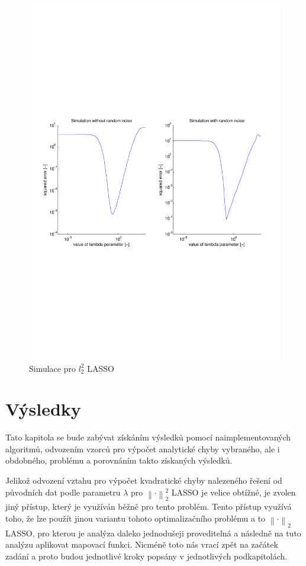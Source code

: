 \documentclass[FM,BP]{tulthesis}
\begin{document}
\begin{figure}[!ht]
	\begin{center}
		\includegraphics[scale=0.7]{obr/l22simulation.pdf}
	\end{center}
	\caption{Simulace pro $l_{2}^{2}$ LASSO}
	\label{fig:l22sim}
\end{figure}
\chapter{Výsledky}
\label{ch:vysledky}
Tato kapitola se bude zabývat získáním výsledků pomocí naimplementovaných algoritmů, odvozením vzorců pro výpočet analytické chyby vybraného, ale i obdobného, problému a porovnáním takto získaných výsledků. 

Jelikož odvození vztahu pro výpočet kvadratické chyby nalezeného řešení od původních dat podle parametru $\lambda$ pro $\left\| \cdot \right\|_{2}^{2} $ LASSO je velice obtížné, je zvolen jiný přístup, který je využíván běžně pro tento problém. Tento přístup využívá toho, že lze použít jinou variantu tohoto optimalizačního problému a to $\left\| \cdot \right\|_{2}$ LASSO, pro kterou je analýza daleko jednodušeji proveditelná a následně na tuto analýzu aplikovat mapovací funkci. Nicméně toto nás vrací zpět na začátek zadání a proto budou jednotlivé kroky popsány v jednotlivých podkapitolách. 
\end{document}
